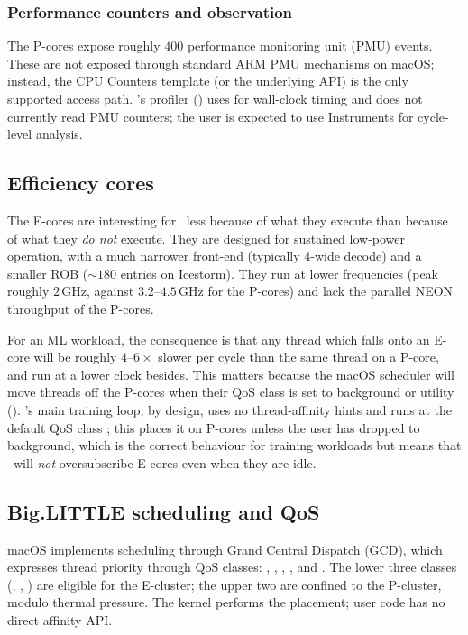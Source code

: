 \subsubsection{Performance counters and observation}

The P-cores expose roughly $400$ performance monitoring unit (PMU)
events. These are not exposed through standard ARM PMU mechanisms on
macOS; instead, the  CPU Counters template (or
the underlying  API) is the only supported access path.
\Lucid's profiler () uses
 for wall-clock timing and does not
currently read PMU counters; the user is expected to use Instruments
for cycle-level analysis.

\subsection{Efficiency cores}
\label{ssec:apple_silicon:e_cores}

The E-cores are interesting for \Lucid\ less because of what they
execute than because of what they \emph{do not} execute. They are
designed for sustained low-power operation, with a much narrower
front-end (typically 4-wide decode) and a smaller ROB ($\sim 180$
entries on Icestorm). They run at lower frequencies (peak roughly
$2$\,GHz, against $3.2$--$4.5$\,GHz for the P-cores) and lack the
parallel NEON throughput of the P-cores.

For an ML workload, the consequence is that any thread which falls
onto an E-core will be roughly $4$--$6\times$ slower per cycle than
the same thread on a P-core, and run at a lower clock besides. This
matters because the macOS scheduler will move threads off the P-cores
when their QoS class is set to background or utility
(). \Lucid's main training
loop, by design, uses no thread-affinity hints and runs at the
default QoS class ; this places it on P-cores
unless the user has dropped to background, which is the correct
behaviour for training workloads but means that \Lucid\ will
\emph{not} oversubscribe E-cores even when they are idle.

\subsection{Big.LITTLE scheduling and QoS}
\label{ssec:apple_silicon:scheduling}

macOS implements scheduling through Grand Central Dispatch (GCD),
which expresses thread priority through QoS classes:
, , ,
, and . The lower three classes
(, , ) are eligible for
the E-cluster; the upper two are confined to the P-cluster, modulo
thermal pressure. The kernel performs the placement; user code has no
direct affinity API.

